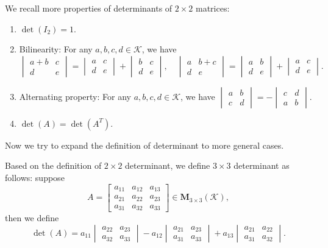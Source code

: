 \documentclass{ctexart}
\begin{document}
    We recall more properties of determinants of $2\times 2$ matrices:
    \begin{enumerate}
        \item $\det(I_2) = 1$.
        \item Bilinearity: For any $a,b,c,d \in \mathcal{K}$, we have
        \[
        \begin{vmatrix} a+b & c \\ d & e \end{vmatrix} = \begin{vmatrix} a & c \\ d & e \end{vmatrix} + \begin{vmatrix} b & c \\ d & e \end{vmatrix}, \quad \begin{vmatrix} a & b+c \\ d & e \end{vmatrix} = \begin{vmatrix} a & b \\ d & e \end{vmatrix} + \begin{vmatrix} a & c \\ d & e \end{vmatrix}.
        \]
        \item Alternating property: For any $a,b,c,d \in \mathcal{K}$, we have
        \(
        \begin{vmatrix} a & b \\ c & d \end{vmatrix} = -\begin{vmatrix} c & d \\ a & b \end{vmatrix}.
        \)
        \item $\det(A)=\det(A^T)$.
    \end{enumerate}
    Now we try to expand the definition of determinant to more general cases.
    \begin{mydef}
        Based on the definition of $2\times 2$ determinant, we define $3\times 3$ determinant as follows: suppose
        \[
        A = \begin{bmatrix}
        a_{11} & a_{12} & a_{13} \\
        a_{21} & a_{22} & a_{23} \\
        a_{31} & a_{32} & a_{33}
        \end{bmatrix} \in \mathbf{M}_{3 \times 3}(\mathcal{K}),
        \]
        then we define
        \[
        \det(A) = a_{11} \begin{vmatrix} a_{22} & a_{23} \\ a_{32} & a_{33} \end{vmatrix} - a_{12} \begin{vmatrix} a_{21} & a_{23} \\ a_{31} & a_{33} \end{vmatrix} + a_{13} \begin{vmatrix} a_{21} & a_{22} \\ a_{31} & a_{32} \end{vmatrix}.
        \]
    \end{mydef}
\end{document}
